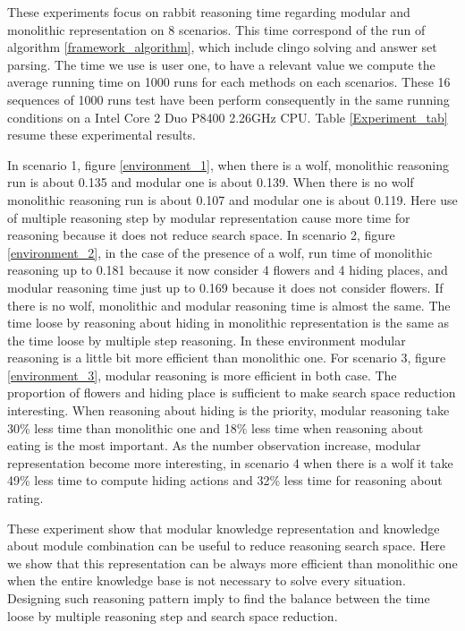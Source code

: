 \documentclass{aamas2012}
\begin{document}
	These experiments focus on rabbit reasoning time regarding modular and monolithic representation on 8 scenarios.
	This time correspond of the run of algorithm \ref{framework_algorithm}, which include clingo solving and answer set parsing.
	The time we use is user one, to have a relevant value we compute the average running time on 1000 runs for each methods on each scenarios.
	These 16 sequences of 1000 runs test have been perform consequently in the same running conditions on a Intel Core 2 Duo P8400 2.26GHz CPU.
	Table \ref{Experiment_tab} resume these experimental results.
	
	In scenario 1, figure \ref{environment_1}, when there is a wolf, monolithic reasoning run is about 0.135 and modular one is about 0.139.
	When there is no wolf monolithic reasoning run is about 0.107 and modular one is about 0.119.
	Here use of multiple reasoning step by modular representation cause more time for reasoning because it does not reduce search space.
	In scenario 2, figure \ref{environment_2}, in the case of the presence of a wolf, 
	run time of monolithic reasoning up to 0.181 because it now consider 4 flowers and 4 hiding places,
	and modular reasoning time just up to 0.169 because it does not consider flowers.
	If there is no wolf, monolithic and modular reasoning time is almost the same.
	The time loose by reasoning about hiding in monolithic representation is the same as the time loose by multiple step reasoning.
	In these environment modular reasoning is a little bit more efficient than monolithic one.
	For scenario 3, figure \ref{environment_3}, modular reasoning is more efficient in both case.
	The proportion of flowers and hiding place is sufficient to make search space reduction interesting.
	When reasoning about hiding is the priority, modular reasoning take 30\% less time than monolithic one and
	18\% less time when reasoning about eating is the most important.
	As the number observation increase, modular representation become more interesting, in scenario 4 when there is a wolf it take 49\% less time to
	compute hiding actions and 32\% less time for reasoning about rating.
	
	These experiment show that modular knowledge representation and knowledge about module combination can be useful to reduce reasoning search space.
	Here we show that this representation can be always more efficient than monolithic one when the entire knowledge base is not necessary to solve every situation.
	Designing such reasoning pattern imply to find the balance between the time loose by multiple reasoning step and search space reduction.
	
\end{document}
